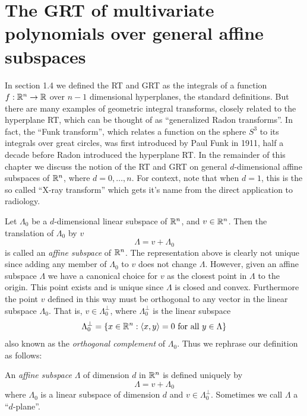 \section{The GRT of multivariate polynomials over general affine subspaces}


In section 1.4 we defined the RT and GRT as the integrals of a function $f: \mathbb{R}^n \rightarrow \mathbb{R}$ over $n-1$ dimensional hyperplanes, the standard definitions. But there are many examples of geometric integral transforms, closely related to the hyperplane RT, which can be thought of as ``generalized Radon transforms''. In fact, the ``Funk transform'', which relates a function on the sphere $S^{3}$ to its integrals over great circles, was first introduced by Paul Funk in 1911, half a decade before Radon introduced the hyperplane RT. In the remainder of this chapter we discuss the notion of the RT and GRT on general $d$-dimensional affine subspaces of $\mathbb{R}^n$, where $d = 0, \ldots, n$. For context, note that when $d = 1$, this is the so called ``X-ray transform'' which gets it's name from the direct application to radiology.

Let $\Lambda_0$ be a $d$-dimensional linear subspace of $\mathbb{R}^n$, and $v \in \mathbb{R}^n$. Then the translation of $\Lambda_0$ by $v$
\[
  \Lambda = v + \Lambda_0
\]
is called an \emph{affine subspace} of $\mathbb{R}^n$. The representation above is clearly not unique since adding any member of $\Lambda_0$ to $v$ does not change $\Lambda$. However, given an affine subspace $\Lambda$ we have a canonical choice for $v$ as the closest point in $\Lambda$ to the origin. This point exists and is unique since $\Lambda$ is closed and convex. Furthermore the point $v$ defined in this way must be orthogonal to any vector in the linear subspace $\Lambda_0$. That is, $v \in \Lambda_0^\perp$, where $\Lambda_0^\perp$ is the linear subspace
\[
  \Lambda_0^\perp = \{x \in \mathbb{R}^n : \langle x, y \rangle = 0 \text{ for all } y \in \Lambda\}
\]
also known as the \emph{orthogonal complement} of $\Lambda_0$. Thus we rephrase our definition as follows:

\begin{definition}
  An \emph{affine subspace} $\Lambda$ of dimension $d$ in $\mathbb{R}^n$ is defined uniquely by
  \[
    \Lambda = v + \Lambda_0
  \]
  where $\Lambda_0$ is a linear subspace of dimension $d$ and $v \in \Lambda_0^\perp$. Sometimes we call $\Lambda$ a ``$d$-plane''.
\end{definition}

